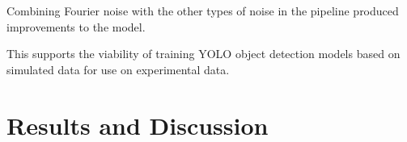 \documentclass[prl,reprint,showpacs,floatfix,nofootinbib]{revtex4-1}
\begin{document}
Combining Fourier noise with the other types of noise in the pipeline produced improvements to the model.



This supports the viability of training YOLO object detection models based on simulated data for use on experimental data.



\section{Results and Discussion}
\blindtext{}




%
%
\end{document}

